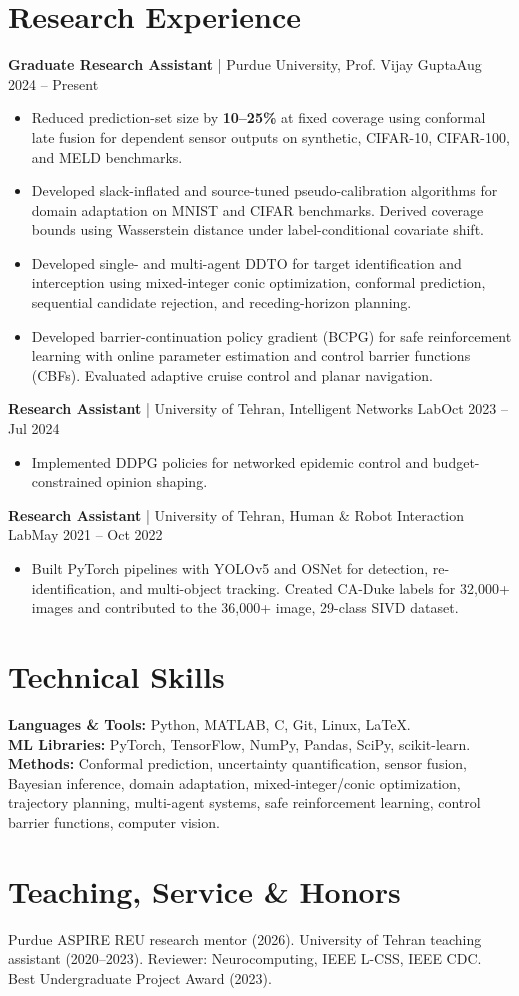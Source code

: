 \documentclass[letterpaper,11pt]{article}
\newcommand{\role}[3]{\textbf{#1} | #2\hfill #3\par}
\begin{document}
\section{Research Experience}
\role{Graduate Research Assistant}{Purdue University, Prof. Vijay Gupta}{Aug 2024 -- Present}
\begin{itemize}
\item Reduced prediction-set size by \textbf{10--25\%} at fixed coverage using conformal late fusion for dependent sensor outputs on synthetic, CIFAR-10, CIFAR-100, and MELD benchmarks.
\item Developed slack-inflated and source-tuned pseudo-calibration algorithms for domain adaptation on MNIST and CIFAR benchmarks. Derived coverage bounds using Wasserstein distance under label-conditional covariate shift.
\item Developed single- and multi-agent DDTO for target identification and interception using mixed-integer conic optimization, conformal prediction, sequential candidate rejection, and receding-horizon planning.
\item Developed barrier-continuation policy gradient (BCPG) for safe reinforcement learning with online parameter estimation and control barrier functions (CBFs). Evaluated adaptive cruise control and planar navigation.
\end{itemize}
\role{Research Assistant}{University of Tehran, Intelligent Networks Lab}{Oct 2023 -- Jul 2024}
\begin{itemize}
\item Implemented DDPG policies for networked epidemic control and budget-constrained opinion shaping.
\end{itemize}
\role{Research Assistant}{University of Tehran, Human \& Robot Interaction Lab}{May 2021 -- Oct 2022}
\begin{itemize}
\item Built PyTorch pipelines with YOLOv5 and OSNet for detection, re-identification, and multi-object tracking. Created CA-Duke labels for 32,000+ images and contributed to the 36,000+ image, 29-class SIVD dataset.
\end{itemize}

\section{Technical Skills}
\textbf{Languages \& Tools:} Python, MATLAB, C, Git, Linux, LaTeX.\\
\textbf{ML Libraries:} PyTorch, TensorFlow, NumPy, Pandas, SciPy, scikit-learn.\\
\textbf{Methods:} Conformal prediction, uncertainty quantification, sensor fusion, Bayesian inference, domain adaptation, mixed-integer/conic optimization, trajectory planning, multi-agent systems, safe reinforcement learning, control barrier functions, computer vision.

\section{Teaching, Service \& Honors}
Purdue ASPIRE REU research mentor (2026). University of Tehran teaching assistant (2020--2023). Reviewer: Neurocomputing, IEEE L-CSS, IEEE CDC. Best Undergraduate Project Award (2023).
\end{document}
